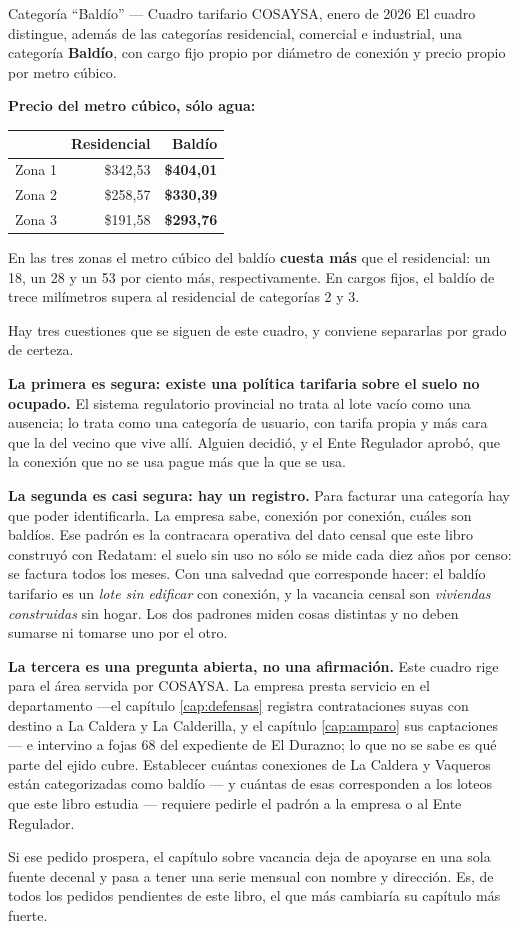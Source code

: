 \begin{ficha}{Categoría ``Baldío'' --- Cuadro tarifario COSAYSA, enero de 2026}
El cuadro distingue, además de las categorías residencial, comercial e industrial, una categoría \textbf{Baldío}, con cargo fijo propio por diámetro de conexión y precio propio por metro cúbico.

\textbf{Precio del metro cúbico, sólo agua:}
\begin{center}\small
\begin{tabular}{@{}lrr@{}}
\toprule
& \textbf{Residencial} & \textbf{Baldío} \\
\midrule
Zona 1 & \$342,53 & \textbf{\$404,01} \\
Zona 2 & \$258,57 & \textbf{\$330,39} \\
Zona 3 & \$191,58 & \textbf{\$293,76} \\
\bottomrule
\end{tabular}
\end{center}

En las tres zonas el metro cúbico del baldío \textbf{cuesta más} que el residencial: un 18, un 28 y un 53 por ciento más, respectivamente. En cargos fijos, el baldío de trece milímetros supera al residencial de categorías 2 y 3.
\end{ficha}

Hay tres cuestiones que se siguen de este cuadro, y conviene separarlas por grado de certeza.

\textbf{La primera es segura: existe una política tarifaria sobre el suelo no ocupado.} El sistema regulatorio provincial no trata al lote vacío como una ausencia; lo trata como una categoría de usuario, con tarifa propia y más cara que la del vecino que vive allí. Alguien decidió, y el Ente Regulador aprobó, que la conexión que no se usa pague más que la que se usa.

\textbf{La segunda es casi segura: hay un registro.} Para facturar una categoría hay que poder identificarla. La empresa sabe, conexión por conexión, cuáles son baldíos. Ese padrón es la contracara operativa del dato censal que este libro construyó con Redatam: el suelo sin uso no sólo se mide cada diez años por censo: se factura todos los meses. Con una salvedad que corresponde hacer: el baldío tarifario es un \textit{lote sin edificar} con conexión, y la vacancia censal son \textit{viviendas construidas} sin hogar. Los dos padrones miden cosas distintas y no deben sumarse ni tomarse uno por el otro.

\textbf{La tercera es una pregunta abierta, no una afirmación.} Este cuadro rige para el área servida por COSAYSA. La empresa presta servicio en el departamento ---el capítulo \ref{cap:defensas} registra contrataciones suyas con destino a La Caldera y La Calderilla, y el capítulo \ref{cap:amparo} sus captaciones--- e intervino a fojas 68 del expediente de El Durazno; lo que no se sabe es qué parte del ejido cubre. Establecer cuántas conexiones de La Caldera y Vaqueros están categorizadas como baldío --- y cuántas de esas corresponden a los loteos que este libro estudia --- requiere pedirle el padrón a la empresa o al Ente Regulador.

Si ese pedido prospera, el capítulo sobre vacancia deja de apoyarse en una sola fuente decenal y pasa a tener una serie mensual con nombre y dirección. Es, de todos los pedidos pendientes de este libro, el que más cambiaría su capítulo más fuerte.
